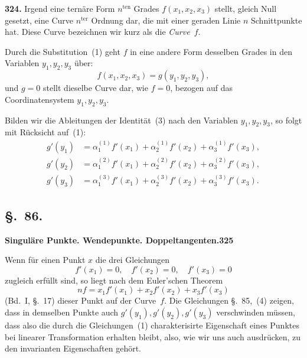 \documentclass[12pt,a4paper]{article}
\begin{document}
\bigskip
\noindent\textbf{324.} Irgend eine tern\"are Form $n^{\text{ten}}$ Grades $f(x_1,x_2,x_3)$ stellt, gleich Null gesetzt, eine Curve $n^{\text{ter}}$ Ordnung dar, die mit einer geraden Linie $n$ Schnittpunkte hat. Diese Curve bezeichnen wir kurz als die \emph{Curve}~$f$.

Durch die Substitution~(1) geht $f$ in eine andere Form desselben Grades in den Variablen $y_1,y_2,y_3$ \"uber:
\begin{equation}
\tag{3}
f(x_1,x_2,x_3) = g(y_1,y_2,y_3),
\end{equation}
und $g=0$ stellt dieselbe Curve dar, wie $f=0$, bezogen auf das Coordinatensystem $y_1,y_2,y_3$.

Bilden wir die Ableitungen der Identit\"at~(3) nach den Variablen $y_1,y_2,y_3$, so folgt mit R\"ucksicht auf~(1):
\begin{equation}
\tag{4}
\begin{aligned}
g'(y_1) &= \alpha_1^{(1)} f'(x_1) + \alpha_2^{(1)} f'(x_2) + \alpha_3^{(1)} f'(x_3),\\
g'(y_2) &= \alpha_1^{(2)} f'(x_1) + \alpha_2^{(2)} f'(x_2) + \alpha_3^{(2)} f'(x_3),\\
g'(y_3) &= \alpha_1^{(3)} f'(x_1) + \alpha_2^{(3)} f'(x_2) + \alpha_3^{(3)} f'(x_3).
\end{aligned}
\end{equation}

\subsection*{\S.~86.}
\textbf{Singul\"are Punkte. Wendepunkte. Doppeltangenten.}\hfill\textbf{325}\\[4pt]

Wenn f\"ur einen Punkt $x$ die drei Gleichungen
\begin{equation}
\tag{1}
f'(x_1) = 0,\quad f'(x_2) = 0,\quad f'(x_3) = 0
\end{equation}
zugleich erf\"ullt sind, so liegt nach dem Euler'schen Theorem
\begin{equation}
\tag{2}
nf = x_1 f'(x_1) + x_2 f'(x_2) + x_3 f'(x_3)
\end{equation}
(Bd.~I, \S.~17) dieser Punkt auf der Curve~$f$. Die Gleichungen \S.~85,~(4) zeigen, dass in demselben Punkte auch $g'(y_1),g'(y_2),g'(y_3)$ verschwinden m\"ussen, dass also die durch die Gleichungen~(1) charakterisirte Eigenschaft eines Punktes bei linearer Transformation erhalten bleibt, also, wie wir uns auch ausdr\"ucken, zu den invarianten Eigenschaften geh\"ort.
\end{document}
